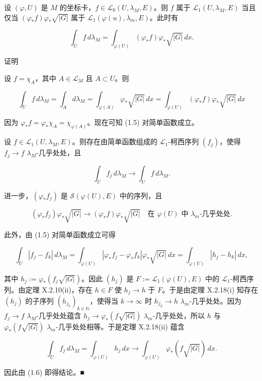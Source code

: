 \begin{theorem}

设 $ (\varphi, U) $ 是 $ M $ 的坐标卡，$ f \in \mathcal{L}_0(U, \lambda_M, E) $。则 $ f $ 属于 $ \mathcal{L}_1(U, \lambda_M, E) $ 当且仅当 $ (\varphi_* f)\varphi_*\sqrt{|G|} $ 属于 $ \mathcal{L}_1(\varphi(u), \lambda_m, E) $。此时有

\begin{equation}
\int_U f \, d\lambda_M = \int_{\varphi(U)} (\varphi_* f)\varphi_*\sqrt{|G|} \, dx .\tag{1.5}
\end{equation}

证明

\begin{subitems}
\item

设 $ f = \chi_A $，其中 $ A \in \mathcal{L}_M $ 且 $ A \subset U $。则

\[
\int_U f \, d\lambda_M = \int_A d\lambda_M = \int_{\varphi(A)} \varphi_*\sqrt{|G|} \, dx = \int_{\varphi(U)} (\varphi_* f)\varphi_*\sqrt{|G|} \, dx
\]

因为 $ \varphi_* f = \varphi_*\chi_A = \chi_{\varphi(A)} $。现在可知 (1.5) 对简单函数成立。

\item

设 $ f \in \mathcal{L}_1(U, \lambda_M, E) $。则存在由简单函数组成的 $ \mathcal{L}_1 $-柯西序列 $ (f_j) $，使得 $ f_j \to f $ $ \lambda_M $-几乎处处，且

\begin{equation}
\int_U f_j \, d\lambda_M \to \int_U f \, d\lambda_M .\tag{1.6}
\end{equation}

进一步，$ (\varphi_* f_j) $ 是 $ \mathcal{S}(\varphi(U), E) $ 中的序列，且

\[
(\varphi_* f_j)\varphi_*\sqrt{|G|} \to (\varphi_* f)\varphi_*\sqrt{|G|} \quad \text{在 } \varphi(U) \text{ 中 } \lambda_m\text{-几乎处处} .
\]

此外，由 (1.5) 对简单函数成立可得

\[
\int_U |f_j - f_k| \, d\lambda_M = \int_{\varphi(U)} |\varphi_* f_j - \varphi_* f_k|\varphi_*\sqrt{|G|} \, dx = \int_{\varphi(U)} |h_j - h_k| \, dx ,
\]

其中 $ h_j := \varphi_*(f_j\sqrt{|G|}) $。因此 $ (h_j) $ 是 $ F := \mathcal{L}_1(\varphi(U), E) $ 中的 $ \mathcal{L}_1 $-柯西序列。由定理 X.2.10(ii)，存在 $ h \in F $ 使 $ h_j \to h $ 于 $ F $。于是由定理 X.2.18(i) 知存在 $ (h_j) $ 的子序列 $ (h_{j_k})_{k \in \mathbb{N}} $，使得当 $ k \to \infty $ 时 $ h_{j_k} \to h $ $ \lambda_m $-几乎处处。因为 $ f_j \to f $ $ \lambda_M $-几乎处处蕴含 $ h_j \to \varphi_*(f\sqrt{|G|}) $ $ \lambda_m $-几乎处处，所以 $ h $ 与 $ \varphi_*(f\sqrt{|G|}) $ $ \lambda_m $-几乎处处相等。于是定理 X.2.18(ii) 蕴含

\[
\int_U f_j \, d\lambda_M = \int_{\varphi(U)} h_j \, dx \to \int_{\varphi(U)} \varphi_*(f\sqrt{|G|}) \, dx .
\]

因此由 (1.6) 即得结论。\nobreak\hspace{0.35em}■

\end{subitems}

\end{theorem}

